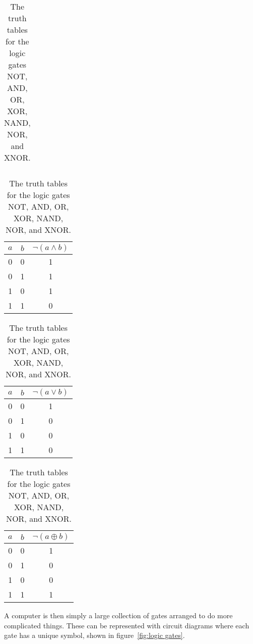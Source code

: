 \begin{table}[ht]
\begin{subtable}{0.2\textwidth}
\begin{tabular}{cc|c}
            \end{tabular}
            \caption{XOR}
        \end{subtable}
        \begin{subtable}{0.3\textwidth}
            \centering
            \begin{tabular}{cc|c}\hline
                \(a\) & \(b\) & \(\neg(a \wedge b)\)\\\hline
                0 & 0 & 1\\
                0 & 1 & 1\\
                1 & 0 & 1\\
                1 & 1 & 0\\\hline
            \end{tabular}
            \caption{NAND}
        \end{subtable}
        \begin{subtable}{0.3\textwidth}
            \centering
            \begin{tabular}{cc|c}\hline
                \(a\) & \(b\) & \(\neg(a \vee b)\)\\\hline
                0 & 0 & 1\\
                0 & 1 & 0\\
                1 & 0 & 0\\
                1 & 1 & 0\\\hline
            \end{tabular}
            \caption{NOR}
        \end{subtable}
    \begin{subtable}{0.3\textwidth}
        \centering
        \begin{tabular}{cc|c}\hline
            \(a\) & \(b\) & \(\neg(a \oplus b)\)\\\hline
            0 & 0 & 1\\
            0 & 1 & 0\\
            1 & 0 & 0\\
            1 & 1 & 1\\\hline
        \end{tabular}
        \caption{XNOR}
    \end{subtable}
    \caption{The truth tables for the logic gates NOT, AND, OR, XOR, NAND, NOR, and XNOR.}
    \label{tab:truth tables}
    \end{table}
    A computer is then simply a large collection of gates arranged to do more complicated things.
    These can be represented with circuit diagrams where each gate has a unique symbol, shown in figure~\ref{fig:logic gates}.
